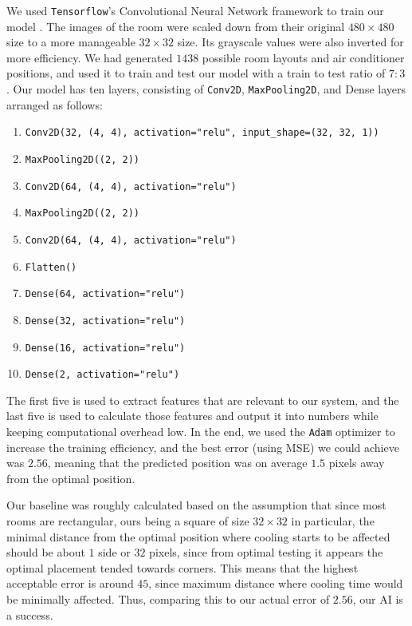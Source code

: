 We used \texttt{Tensorflow}'s Convolutional Neural Network framework to train our model \cite{tensorflow-cnn}. The images of the room were scaled down from their original $480\times 480$ size to a more manageable $32\times 32$ size. Its grayscale values were also inverted for more efficiency. We had generated $1438$ possible room layouts and air conditioner positions, and used it to train and test our model with a train to test ratio of $7:3$. Our model has ten layers, consisting of \texttt{Conv2D}, \texttt{MaxPooling2D}, and Dense layers arranged as follows:
\begin{enumerate}
    \item \texttt{Conv2D(32, (4, 4), activation="relu", input\_shape=(32, 32, 1))}
    \item \texttt{MaxPooling2D((2, 2))}
    \item \texttt{Conv2D(64, (4, 4), activation="relu")}
    \item \texttt{MaxPooling2D((2, 2))}
    \item \texttt{Conv2D(64, (4, 4), activation="relu")}
    \item \texttt{Flatten()}
    \item \texttt{Dense(64, activation="relu")}
    \item \texttt{Dense(32, activation="relu")}
    \item \texttt{Dense(16, activation="relu")}
    \item \texttt{Dense(2, activation="relu")}
\end{enumerate}
The first five is used to extract features that are relevant to our system, and the last five is used to calculate those features and output it into numbers while keeping computational overhead low. In the end, we used the \texttt{Adam} optimizer to increase the training efficiency, and the best error (using MSE) we could achieve was $2.56$, meaning that the predicted position was on average $1.5$ pixels away from the optimal position. 

Our baseline was roughly calculated based on the assumption that since most rooms are rectangular, ours being a square of size $32\times 32$ in particular, the minimal distance from the optimal position where cooling starts to be affected should be about $1$ side or $32$ pixels, since from optimal testing it appears the optimal placement tended towards corners. This means that the highest acceptable error is around $45$, since maximum distance where cooling time would be minimally affected. Thus, comparing this to our actual error of $2.56$, our AI is a success.

